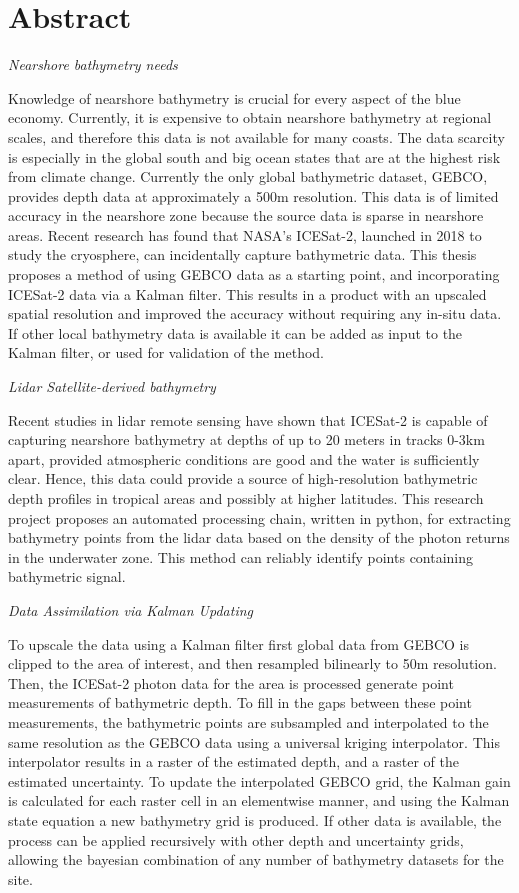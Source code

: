 \chapter*{Abstract}
\noindent\emph{Nearshore bathymetry needs}

Knowledge of nearshore bathymetry is crucial for every aspect of the blue economy. Currently, it is expensive to obtain nearshore bathymetry at regional scales, and therefore this data is not available for many coasts. The data scarcity is especially in the global south and big ocean states that are at the highest risk from climate change. Currently the only global bathymetric dataset, GEBCO, provides depth data at approximately a 500m resolution. This data is of limited accuracy in the nearshore zone because the source data is sparse in nearshore areas. Recent research has found that NASA's ICESat-2, launched in 2018 to study the cryosphere, can incidentally capture bathymetric data. This thesis proposes a method of using GEBCO data as a starting point, and incorporating ICESat-2 data via a Kalman filter. This results in a product with an upscaled spatial resolution and improved the accuracy without requiring any in-situ data. If other local bathymetry data is available it can be added as input to the Kalman filter, or used for validation of the method. 

\noindent\emph{Lidar Satellite-derived bathymetry}

Recent studies in lidar remote sensing have shown that ICESat-2 is capable of capturing nearshore bathymetry at depths of up to 20 meters in tracks 0-3km apart, provided atmospheric conditions are good and the water is sufficiently clear. Hence, this data could provide a source of high-resolution bathymetric depth profiles in tropical areas and possibly at higher latitudes. This research project proposes an automated processing chain, written in python, for extracting bathymetry points from the lidar data based on the density of the photon returns in the underwater zone. This method can reliably identify points containing bathymetric signal. 


\noindent\emph{Data Assimilation via Kalman Updating}

To upscale the data using a Kalman filter first global data from GEBCO is clipped to the area of interest, and then resampled bilinearly to 50m resolution. Then, the ICESat-2 photon data for the area is processed generate point measurements of bathymetric depth. To fill in the gaps between these point measurements, the bathymetric points are subsampled and interpolated to the same resolution as the GEBCO data using a universal kriging interpolator. This interpolator results in a raster of the estimated depth, and a raster of the estimated uncertainty. To update the interpolated GEBCO grid, the Kalman gain is calculated for each raster cell in an elementwise manner, and using the Kalman state equation a new bathymetry grid is produced. If other data is available, the process can be applied recursively with other depth and uncertainty grids, allowing the bayesian combination of any number of bathymetry datasets for the site.

